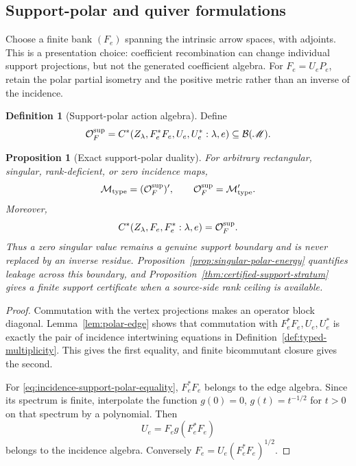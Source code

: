 \documentclass[11pt]{article}
\numberwithin{equation}{section}
\newtheorem{proposition}[theorem]{Proposition}
\theoremstyle{definition}
\newtheorem{definition}[theorem]{Definition}
\theoremstyle{remark}
\newcommand{\M}{\mathcal M}
\newcommand{\Oalg}{\mathcal O}
\begin{document}
\subsection{Support-polar and quiver formulations}

Choose a finite bank $(F_e)$ spanning the intrinsic arrow spaces, with
adjoints.  This is a presentation choice: coefficient recombination can
change individual support projections, but not the generated coefficient
algebra.  For $F_e=U_eP_e$, retain the polar partial isometry and the positive
metric rather than an inverse of the incidence.

\begin{definition}[Support-polar action algebra]
\label{def:support-polar}
Define
\begin{equation}
\Oalg_F^{\rm sup}
=
C^*(Z_\lambda,F_e^*F_e,U_e,U_e^*:\lambda,e)
\subseteq\mathcal B(\mathscr M).
\label{eq:support-polar}
\end{equation}
\end{definition}

\begin{proposition}[Exact support-polar duality]
\label{thm:support-polar}
For arbitrary rectangular, singular, rank-deficient, or zero incidence maps,
\begin{equation}
\M_{\rm type}
=
(\Oalg_F^{\rm sup})',
\qquad
\Oalg_F^{\rm sup}
=
\M_{\rm type}'.
\label{eq:support-polar-duality}
\end{equation}
Moreover,
\begin{equation}
C^*(Z_\lambda,F_e,F_e^*:\lambda,e)
=
\Oalg_F^{\rm sup}.
\label{eq:incidence-support-polar-equality}
\end{equation}
Thus a zero singular value remains a genuine support boundary and is never
replaced by an inverse residue.  Proposition~\ref{prop:singular-polar-energy}
quantifies leakage across this boundary, and
Proposition~\ref{thm:certified-support-stratum} gives a finite support certificate
when a source-side rank ceiling is available.
\end{proposition}

\begin{proof}
Commutation with the vertex projections makes an operator block diagonal.
Lemma~\ref{lem:polar-edge} shows that commutation with
$F_e^*F_e,U_e,U_e^*$ is exactly the pair of incidence intertwining equations
in Definition~\ref{def:typed-multiplicity}.  This gives the first equality,
and finite bicommutant closure gives the second.

For \eqref{eq:incidence-support-polar-equality}, $F_e^*F_e$ belongs to the edge
algebra.  Since its spectrum is finite, interpolate the function
$g(0)=0$, $g(t)=t^{-1/2}$ for $t>0$ on that spectrum by a polynomial.
Then
\[
U_e=F_eg(F_e^*F_e)
\]
belongs to the incidence algebra.  Conversely
$F_e=U_e(F_e^*F_e)^{1/2}$.
\end{proof}
\end{document}
